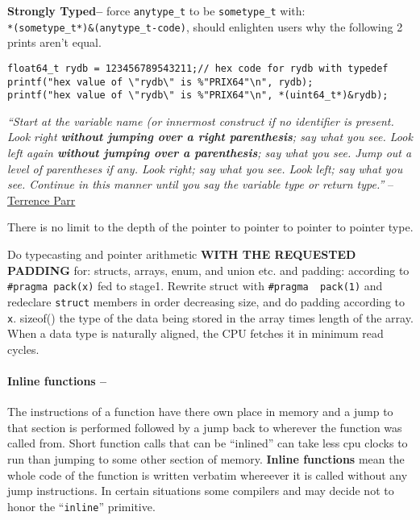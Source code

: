 \textbf{Strongly Typed--} force \texttt{anytype\_t} to be
\texttt{sometype\_t} with:\\
\texttt{*(sometype\_t*)\&(anytype\_t-code)}, should enlighten users why
the following 2 prints aren't equal.

\begin{verbatim}
float64_t rydb = 123456789543211;// hex code for rydb with typedef
printf("hex value of \"rydb\" is %"PRIX64"\n", rydb);
printf("hex value of \"rydb\" is %"PRIX64"\n", *(uint64_t*)&rydb);
\end{verbatim}

\emph{``Start at the variable name (or innermost construct if no
identifier is present. Look right \textbf{without jumping over a right
parenthesis}; say what you see. Look left again \textbf{without jumping
over a parenthesis}; say what you see. Jump out a level of parentheses
if any. Look right; say what you see. Look left; say what you see.
Continue in this manner until you say the variable type or return
type.''}
--\href{https://parrt.cs.usfca.edu/doc/how-to-read-C-declarations.html}{Terrence
Parr}

There is no limit to the depth of the pointer to pointer to pointer to
pointer type.

Do typecasting and pointer arithmetic \textbf{WITH THE REQUESTED
PADDING} for: structs, arrays, enum, and union etc. and padding:
according to \texttt{\#pragma\ pack(x)} fed to stage1. Rewrite struct
with \texttt{\#pragma\ \ pack(1)} and redeclare \texttt{struct} members
in order decreasing size, and do padding according to \texttt{x}.
sizeof() the type of the data being stored in the array times length of
the array. When a data type is naturally aligned, the CPU fetches it in
minimum read cycles.

\hypertarget{inline-functions}{%
\paragraph{Inline functions --}\label{inline-functions}}

The instructions of a function have there own place in memory and a jump
to that section is performed followed by a jump back to wherever the
function was called from. Short function calls that can be ``inlined''
can take less cpu clocks to run than jumping to some other section of
memory. \textbf{Inline functions} mean the whole code of the function is
written verbatim whereever it is called without any jump instructions.
In certain situations some compilers and may decide not to honor the
``\texttt{inline}'' primitive.

